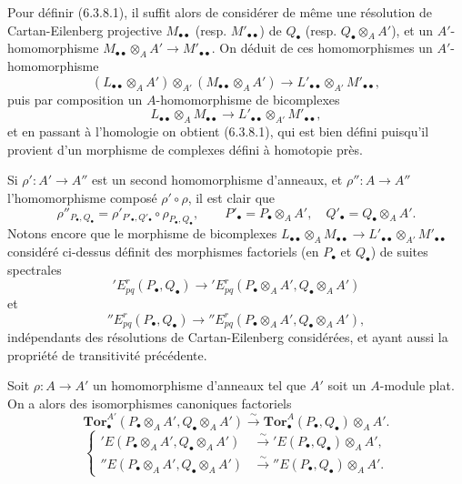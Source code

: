 \begin{env}[6.3.8]
Pour définir (6.3.8.1), il suffit alors de considérer de même une résolution
de Cartan-Eilenberg projective $M_{\bullet\bullet}$ (resp.
$M'_{\bullet\bullet}$) de $Q_\bullet$ (resp.
$Q_\bullet\otimes_A A'$), et un $A'$-homomorphisme
$M_{\bullet\bullet}\otimes_A A'\to M'_{\bullet\bullet}$. On déduit de ces
homomorphismes un $A'$-homomorphisme
\[
  (L_{\bullet\bullet}\otimes_A A')\otimes_{A'}
  (M_{\bullet\bullet}\otimes_A A')
  \longrightarrow
  L'_{\bullet\bullet}\otimes_{A'}M'_{\bullet\bullet},
\]
puis par composition un $A$-homomorphisme de bicomplexes
\[
  L_{\bullet\bullet}\otimes_A M_{\bullet\bullet}
  \longrightarrow
  L'_{\bullet\bullet}\otimes_{A'}M'_{\bullet\bullet},
\]
et en passant à l'homologie on obtient (6.3.8.1), qui est bien défini
puisqu'il provient d'un morphisme de complexes défini à homotopie près.

Si $\rho':A'\to A''$ est un second homomorphisme d'anneaux, et
$\rho'':A\to A''$ l'homomorphisme composé $\rho'\circ\rho$, il est clair que
\[
  \rho''_{P_\bullet,Q_\bullet}
  =\rho'_{P'_\bullet,Q'_\bullet}\circ\rho_{P_\bullet,Q_\bullet},
  \qquad
  P'_\bullet=P_\bullet\otimes_A A',
  \quad Q'_\bullet=Q_\bullet\otimes_A A'.
\]
Notons encore que le morphisme de bicomplexes
$L_{\bullet\bullet}\otimes_A M_{\bullet\bullet}
\to L'_{\bullet\bullet}\otimes_{A'}M'_{\bullet\bullet}$ considéré
ci-dessus définit des morphismes factoriels (en $P_\bullet$ et $Q_\bullet$)
de suites spectrales
\[
  'E_{pq}^r(P_\bullet,Q_\bullet)
  \longrightarrow
  'E_{pq}^r(P_\bullet\otimes_A A',Q_\bullet\otimes_A A')
\]
et
\[
  ''E_{pq}^r(P_\bullet,Q_\bullet)
  \longrightarrow
  ''E_{pq}^r(P_\bullet\otimes_A A',Q_\bullet\otimes_A A'),
\]
indépendants des résolutions de Cartan-Eilenberg considérées, et ayant aussi
la propriété de transitivité précédente.
\end{env}

\begin{proposition}[6.3.9]
Soit $\rho:A\to A'$ un homomorphisme d'anneaux tel que $A'$ soit un
$A$-module plat. On a alors des isomorphismes canoniques factoriels
\[
  \mathbf{Tor}_\bullet^{A'}
  (P_\bullet\otimes_A A',Q_\bullet\otimes_A A')
  \xrightarrow{\sim}
  \mathbf{Tor}_\bullet^A(P_\bullet,Q_\bullet)\otimes_A A'.
  \tag{6.3.9.1}\label{III.6.3.9.1.fr}
\]
\[
  \left\{
  \begin{aligned}
  'E(P_\bullet\otimes_A A',Q_\bullet\otimes_A A')
    &\xrightarrow{\sim}'E(P_\bullet,Q_\bullet)\otimes_A A',\\
  ''E(P_\bullet\otimes_A A',Q_\bullet\otimes_A A')
    &\xrightarrow{\sim}''E(P_\bullet,Q_\bullet)\otimes_A A'.
  \end{aligned}
  \right.
  \tag{6.3.9.2}\label{III.6.3.9.2.fr}
\]
\end{proposition}


